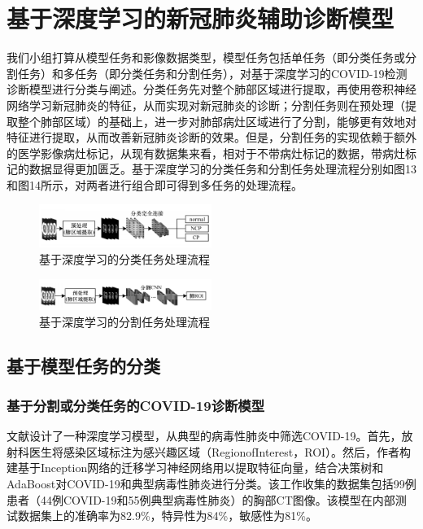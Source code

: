 \documentclass[journal,twoside,web]{ieeecolor}
\begin{document}
\section{基于深度学习的新冠肺炎辅助诊断模型}
我们小组打算从模型任务和影像数据类型，模型任务包括单任务（即分类任务或分割任务）和多任务（即分类任务和分割任务），对基于深度学习的COVID-19检测诊断模型进行分类与阐述。分类任务先对整个肺部区域进行提取，再使用卷积神经网络学习新冠肺炎的特征，从而实现对新冠肺炎的诊断；分割任务则在预处理（提取整个肺部区域）的基础上，进一步对肺部病灶区域进行了分割，能够更有效地对特征进行提取，从而改善新冠肺炎诊断的效果。但是，分割任务的实现依赖于额外的医学影像病灶标记，从现有数据集来看，相对于不带病灶标记的数据，带病灶标记的数据显得更加匮乏。基于深度学习的分类任务和分割任务处理流程分别如图13和图14所示，对两者进行组合即可得到多任务的处理流程。
\begin{figure}[h]
\centering
\includegraphics[width=0.5\textwidth]{img/fig2.png}
\caption{基于深度学习的分类任务处理流程}
\label{fig:COVID-19_classification_and_segmentation_process}
\end{figure}
\begin{figure}[h]
\centering
\includegraphics[width=0.5\textwidth]{img/fig3.png}
\caption{基于深度学习的分割任务处理流程}
\label{fig:COVID-19_classification_and_segmentation_process}
\end{figure}
\subsection{基于模型任务的分类}
\subsubsection{基于分割或分类任务的COVID-19诊断模型}

文献\cite{b1}设计了一种深度学习模型，从典型的病毒性肺炎中筛选COVID-19。首先，放射科医生将感染区域标注为感兴趣区域（RegionofInterest，ROI）。然后，作者构建基于Inception网络\cite{b2}的迁移学习神经网络用以提取特征向量，结合决策树和AdaBoost\cite{b3}对COVID-19和典型病毒性肺炎进行分类。该工作收集的数据集包括99例患者（44例COVID-19和55例典型病毒性肺炎）的胸部CT图像。该模型在内部测试数据集上的准确率为82.9\%，特异性为84\%，敏感性为81\%。
\end{document}
